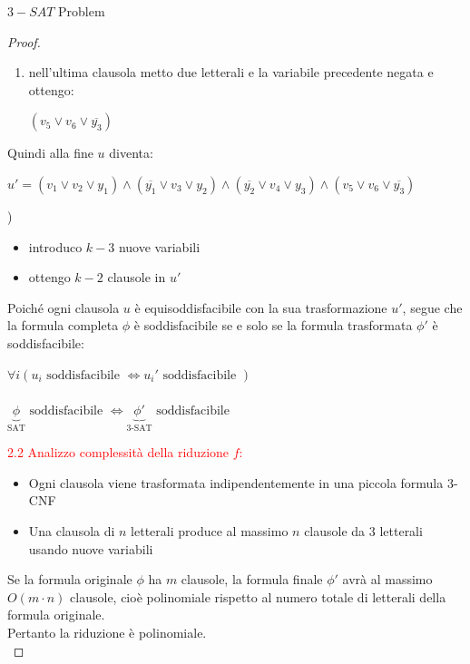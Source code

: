 \documentclass{article}  %
\theoremstyle{definition}
\begin{document}
\begin{theorem}{$3-SAT$ Problem}
\begin{proof}
\begin{enumerate}
{\begin{enumerate}
\begin{enumerate}
						                  nuova) e ottengo:
						                  \begin{itemize}
							                  \item seconda clausola: $(\overline{y_1} \lor v_3 \lor y_2)$
							                  \item terza clausola: $(\overline{y_2} \lor v_4 \lor y_3)$
						                  \end{itemize}
						            \item nell'ultima clausola metto due letterali e la variabile precedente negata e ottengo:
						                  \begin{center}
							                  $(v_5 \lor v_6 \lor \overline{y_3})$
						                  \end{center}
					            \end{enumerate}
				      \end{enumerate}
				      Quindi alla fine $u$ diventa:
				      \begin{center}
					      $u'=(v_1 \lor v_2 \lor y_1) \land (\overline{y_1} \lor v_3 \lor y_2) \land (\overline{y_2} \lor v_4 \lor y_3) \land (v_5 \lor v_6 \lor \overline{y_3})$
				      \end{center}
			      })
			      \begin{itemize}
				      \item introduco $k-3$ nuove variabili
				      \item ottengo $k-2$ clausole in $u'$
			      \end{itemize}
		\end{enumerate}
		Poiché ogni clausola $u$ è equisoddisfacibile con la sua trasformazione $u'$, segue che la formula completa $\phi$ è soddisfacibile se e solo se la formula trasformata $\phi'$ è soddisfacibile:
		\begin{center}
			$\forall{i}(u_i \text{ soddisfacibile } \iff u_i' \text{ soddisfacibile })$ \\
			 \\
			$\underbrace{\phi}_{\text{SAT}} \text{ soddisfacibile } \iff \underbrace{\phi'}_{\text{3-SAT}} \text{ soddisfacibile}$
		\end{center}

		\textcolor{red}{{2.2 Analizzo complessità della riduzione $f$:}}
		\begin{itemize}
			\item Ogni clausola viene trasformata indipendentemente in una piccola formula 3-CNF
			\item Una clausola di $n$ letterali produce al massimo $n$ clausole da 3 letterali usando nuove variabili
		\end{itemize}
		Se la formula originale $\phi$ ha $m$ clausole, la formula finale $\phi'$ avrà al massimo $O(m \cdot n)$ clausole,
		cioè polinomiale rispetto al numero totale di letterali della formula originale. \\
		Pertanto la riduzione è polinomiale. \\


\end{proof}
\end{theorem}
\end{document}
